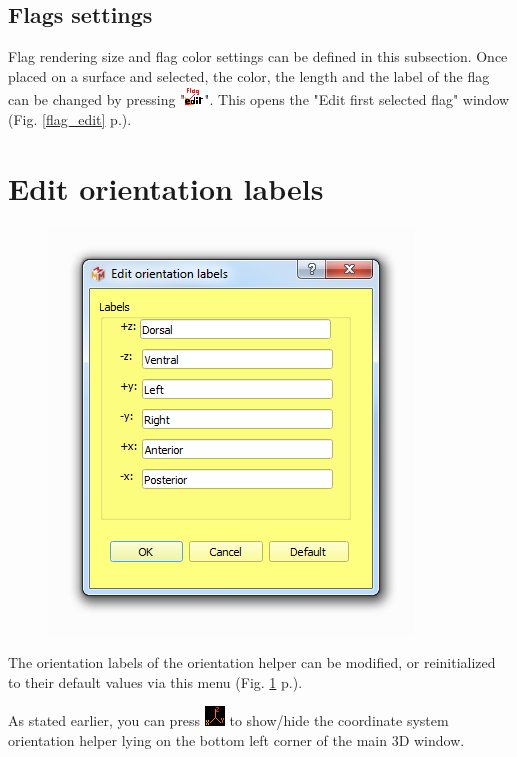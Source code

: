 \subsection{Flags settings}
Flag rendering size and flag color settings can be defined in this subsection. Once placed on a surface and selected, the color, the length and the label of the flag can be changed by pressing "\includegraphics[scale=0.7]{images/06/objects/flag_edit.png}". This opens the "Edit first selected flag" window (Fig. \ref{flag_edit} p.\pageref{flag_edit}).




\section{Edit orientation labels}
\begin{figure}
  \centering  
 \includegraphics[scale=0.5]{images/08/orientation_labels.png}
\label{orientation_labels}
\end{figure}
The orientation labels of the orientation helper can be modified, or reinitialized to their default values via this menu (Fig. \ref{orientation_labels} p.\pageref{orientation_labels}).

As stated earlier, you can press \includegraphics[scale=0.7]{images/06/display/orientation_helper.png} to show/hide the coordinate system orientation helper lying on the bottom left corner of the main 3D window.


